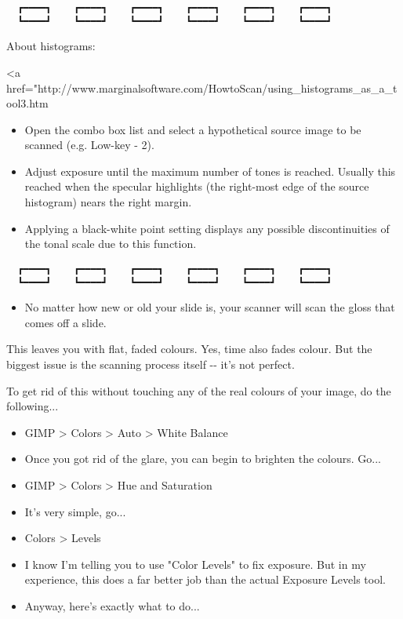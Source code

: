 \documentclass[
]{article}
\providecommand{\tightlist}{%
  \setlength{\itemsep}{0pt}\setlength{\parskip}{0pt}}
\begin{document}
\begin{verbatim}
  ┏━━━━┓    ┏━━━━┓    ┏━━━━┓    ┏━━━━┓    ┏━━━━┓    ┏━━━━┓  
  ┗━━━━┛    ┗━━━━┛    ┗━━━━┛    ┗━━━━┛    ┗━━━━┛    ┗━━━━┛  
\end{verbatim}

About histograms:

\textless a
href="http://www.marginalsoftware.com/HowtoScan/using\_histograms\_as\_a\_tool3.htm

\begin{itemize}
\item
  Open the combo box list and select a hypothetical source image to be
  scanned (e.g. Low-key - 2).
\item
  Adjust exposure until the maximum number of tones is reached. Usually
  this reached when the specular highlights (the right-most edge of the
  source histogram) nears the right margin.
\item
  Applying a black-white point setting displays any possible
  discontinuities of the tonal scale due to this function.
\end{itemize}

\begin{verbatim}
  ┏━━━━┓    ┏━━━━┓    ┏━━━━┓    ┏━━━━┓    ┏━━━━┓    ┏━━━━┓  
  ┗━━━━┛    ┗━━━━┛    ┗━━━━┛    ┗━━━━┛    ┗━━━━┛    ┗━━━━┛  
\end{verbatim}

\begin{itemize}
\tightlist
\item
  No matter how new or old your slide is, your scanner will scan the
  gloss that comes off a slide.
\end{itemize}

This leaves you with flat, faded colours. Yes, time also fades colour.
But the biggest issue is the scanning process itself -\/- it's not
perfect.

To get rid of this without touching any of the real colours of your
image, do the following...

\begin{itemize}
\tightlist
\item
  GIMP \textgreater{} Colors \textgreater{} Auto \textgreater{} White
  Balance
\item
  Once you got rid of the glare, you can begin to brighten the colours.
  Go...
\item
  GIMP \textgreater{} Colors \textgreater{} Hue and Saturation
\item
  It's very simple, go...
\item
  Colors \textgreater{} Levels
\item
  I know I'm telling you to use "Color Levels" to fix exposure. But in
  my experience, this does a far better job than the actual Exposure
  Levels tool.
\item
  Anyway, here's exactly what to do...
\end{itemize}
\end{document}
